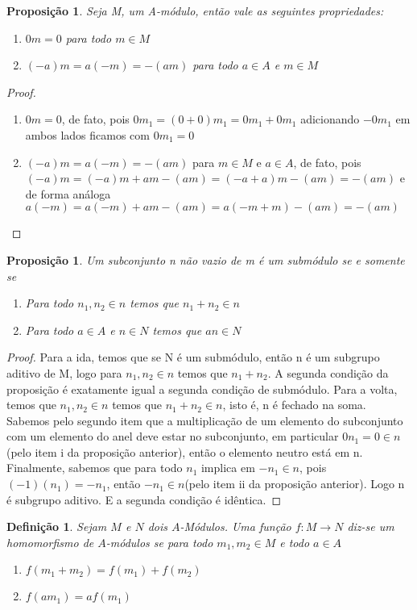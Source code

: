 \documentclass[10pt,a4paper]{article}
\newtheorem{proposition}[theorem]{Proposição}
\newtheorem{definition}[theorem]{Definição}
\begin{document}
\begin{proposition}
	Seja M, um A-módulo, então vale as seguintes propriedades:
	\begin{enumerate}
		\item $0m=0$ para todo $m \in M$
		\item $(-a)m=a(-m)=-(am)$ para todo $a \in A$ e $m \in M$
	\end{enumerate}
\end{proposition}

\begin{proof}
	\begin{enumerate}
		\item $0m=0$, de fato, pois $0m_1=(0+0)m_1=0m_1+0m_1$ adicionando $-0m_1$ em ambos lados ficamos com $0m_1=0$
		\item $(-a)m=a(-m)=-(am)$ para $m \in M$ e $a \in A$, de fato, pois $(-a)m=(-a)m+am-(am)=(-a+a)m-(am)=-(am)$ e de forma análoga $a(-m)=a(-m)+am-(am)=a(-m+m)-(am)=-(am)$
	\end{enumerate}
\end{proof}

\begin{proposition}
	Um subconjunto n não vazio de m é um submódulo se e somente se
	\begin{enumerate}
		\item Para todo $n_1, n_2 \in n$ temos que $n_1+n_2 \in n$
		\item Para todo $a \in A$ e $n \in N$ temos que $an \in N$
	\end{enumerate}
\end{proposition}
\begin{proof}
	Para a ida, temos que se N é um submódulo, então n é um subgrupo aditivo de M, logo para $n_1, n_2 \in n$ temos que $n_1+n_2$. A segunda condição da proposição é exatamente igual a segunda condição de submódulo.
	Para a volta, temos que  $n_1, n_2 \in n$ temos que $n_1+n_2 \in n$, isto é, n é fechado na soma. Sabemos pelo segundo item que a multiplicação de um elemento do subconjunto com um elemento do anel deve estar no subconjunto, em particular $0 n_1 = 0 \in n$(pelo item i da proposição anterior), então o elemento neutro está em n. Finalmente, sabemos que para todo $n_1$ implica em $-n_1 \in n$, pois $(-1)(n_1)=-n_1$, então $-n_1 \in n$(pelo item ii da proposição anterior). Logo n é subgrupo aditivo. E a segunda condição é idêntica.
\end{proof}

\begin{definition}
	Sejam $M$ e $N$ dois $A$-Módulos. Uma função $f:M \rightarrow N$ diz-se um homomorfismo de $A$-módulos se para todo $m_1, m_2 \in M$ e todo $a \in A$
	\begin{enumerate}
		\item $f(m_1+m_2)=f(m_1)+f(m_2)$
		\item $f(am_1)=af(m_1)$
	\end{enumerate}
\end{definition}
\end{document}
